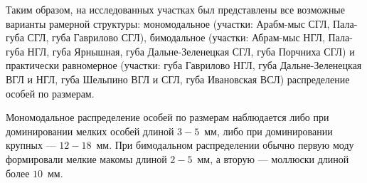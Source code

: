 \bigskip

Таким образом, на исследованных участках был представлены все возможные варианты рамерной структуры: мономодальное (участки: Арабм-мыс СГЛ, Пала-губа СГЛ, губа Гаврилово СГЛ), бимодальное (участки: Абрам-мыс НГЛ, Пала-губа НГЛ, губа Ярнышная, губа Дальне-Зеленецкая СГЛ, губа Порчниха СГЛ) и практически равномерное (участки: губа Гаврилово НГЛ, губа Дальне-Зеленецкая ВГЛ и НГЛ, губа Шельпино ВГЛ и СГЛ, губа Ивановская ВСЛ) распределение особей по размерам. 

Мономодальное распределение особей по размерам наблюдается либо при доминировании мелких особей длиной $3-5$~мм, либо при доминировании крупных --- $12-18$~мм.
При бимодальном распределении обычно первую моду формировали мелкие макомы длиной $2-5$~мм, а вторую --- моллюски длиной более $10$~мм.

\afterpage{\clearpage}
